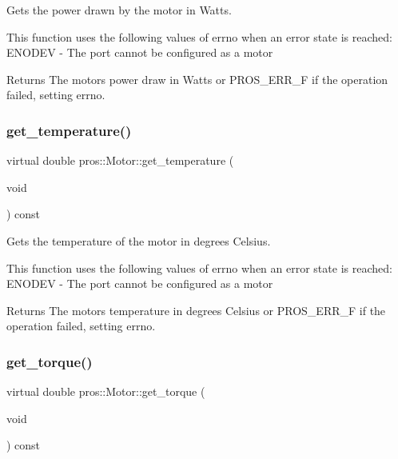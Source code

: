 Gets the power drawn by the motor in Watts. 

This function uses the following values of errno when an error state is reached\+: E\+N\+O\+D\+EV -\/ The port cannot be configured as a motor

\begin{DoxyReturn}{Returns}
The motor\textquotesingle{}s power draw in Watts or P\+R\+O\+S\+\_\+\+E\+R\+R\+\_\+F if the operation failed, setting errno. 
\end{DoxyReturn}
\mbox{\label{classpros_1_1Motor_a9fd793251b91c2ac0091c65f290f740d}} 
\subsubsection{\texorpdfstring{get\+\_\+temperature()}{get\_temperature()}}
{\footnotesize\ttfamily virtual double pros\+::\+Motor\+::get\+\_\+temperature (\begin{DoxyParamCaption}\item[{void}]{ }\end{DoxyParamCaption}) const\hspace{0.3cm}{\ttfamily [virtual]}}



Gets the temperature of the motor in degrees Celsius. 

This function uses the following values of errno when an error state is reached\+: E\+N\+O\+D\+EV -\/ The port cannot be configured as a motor

\begin{DoxyReturn}{Returns}
The motor\textquotesingle{}s temperature in degrees Celsius or P\+R\+O\+S\+\_\+\+E\+R\+R\+\_\+F if the operation failed, setting errno. 
\end{DoxyReturn}
\mbox{\label{classpros_1_1Motor_a14e0c57c0ca7bde15f73414abf4c3c8e}} 
\subsubsection{\texorpdfstring{get\+\_\+torque()}{get\_torque()}}
{\footnotesize\ttfamily virtual double pros\+::\+Motor\+::get\+\_\+torque (\begin{DoxyParamCaption}\item[{void}]{ }\end{DoxyParamCaption}) const\hspace{0.3cm}{\ttfamily [virtual]}}



